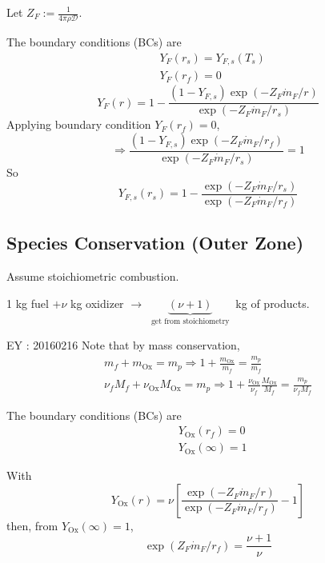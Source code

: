 \documentclass[10pt]{amsart}
\begin{document}
\begin{multicols*}{2}
Let $Z_F := \frac{1}{4\pi \rho \mathcal{D}}$.  

The boundary conditions (BCs) are 
\[
\begin{aligned}
  & Y_F(r_s) = Y_{F,s}(T_s) \\ 
  & Y_F(r_f) = 0
\end{aligned}
\]
\[
Y_F(r) = 1 - \frac{ (1-Y_{F,s} ) \exp{ (-Z_F \dot{m}_F/r ) }}{ \exp{ (-Z_F \dot{m}_F /r_s ) } }
\]
Applying boundary condition $Y_F(r_f)=0$, 
\[
\Longrightarrow \frac{ (1 - Y_{F,s})\exp{ (-Z_F \dot{m}_F/r_f ) } }{ \exp{ (-Z_F \dot{m}_F/r_s ) } } = 1 
\]
So 
\begin{equation}\label{Eq:DropletI}
\boxed{   Y_{F,s}(r_s) = 1 - \frac{ \exp{(-Z_F \dot{m}_F /r_s ) } }{ \exp{ (-Z_F \dot{m}_F /r_f ) } }   }
\end{equation}











\subsection{Species Conservation (Outer Zone)}

Assume stoichiometric combustion.  

1 kg fuel $ + \nu $ kg oxidizer $\to $ $\underbrace{ (\nu + 1) }_{ \text{ get from stoichiometry } } $ kg of products.  

EY : 20160216 Note that by mass conservation, 
\[
\begin{gathered}
  m_f + m_{\text{Ox}} = m_p \Longrightarrow 1 + \frac{m_{\text{Ox}}}{ m_f} = \frac{ m_p }{m_f } \\ 
  \nu_f M_f + \nu_{\text{Ox}} M_{\text{Ox}} = m_p \Longrightarrow 1 + \frac{ \nu_{\text{Ox}} }{ \nu_f } \frac{M_{\text{Ox}}}{M_f} = \frac{m_p}{ \nu_f M_f }
\end{gathered}
\]

The boundary conditions (BCs) are 
\[
\begin{aligned}
  & Y_{\text{Ox}}(r_f) = 0 \\ 
  & Y_{\text{Ox}}(\infty) = 1
\end{aligned}
\]

With
\[
Y_{\text{Ox}}(r) = \nu \left[ \frac{ \exp{ (-Z_F \dot{m}_F /r ) } }{ \exp{ (-Z_F \dot{m}_F /r_f )} } - 1 \right]
\]
then, from $Y_{\text{Ox}}(\infty)=1$, 
\begin{equation}\label{Eq:DropletII}
\boxed{   \exp{ ( Z_F \dot{m}_F /r_f) } = \frac{\nu+1}{\nu} }
\end{equation}


\end{multicols*}
\end{document}
